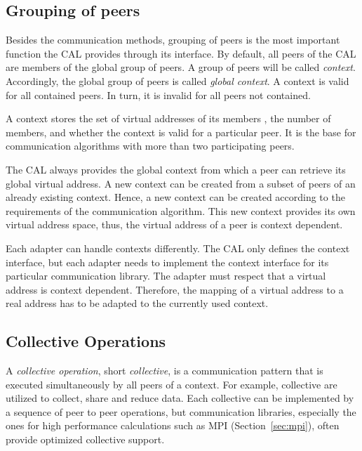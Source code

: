 \subsection{Grouping of peers}
\label{sec:cal_context}
Besides the communication methods, grouping of peers is the most
important function the CAL provides through its interface.  By
default, all peers of the CAL are members of the global group of peers.
A group of peers will be called \textit{context}. Accordingly, the
global group of peers is called \emph{global context}. A context is valid for
all contained peers. In turn, it is invalid for all peers not
contained.

A context stores the set of virtual addresses of its members , the
number of members, and whether the context is valid for a particular
peer. It is the base for communication algorithms with more than two
participating peers.

The CAL always provides the global context from which a peer can
retrieve its global virtual address. A new context can be created from
a subset of peers of an already existing context. Hence, a new context
can be created according to the requirements of the communication
algorithm. This new context provides its own virtual address space,
thus, the virtual address of a peer is context dependent.

Each adapter can handle contexts differently. The CAL only
defines the context interface, but each adapter needs to implement the
context interface for its particular communication
library. The adapter must respect that a virtual address
is context dependent. Therefore, the mapping of a virtual address to a
real address has to be adapted to the currently used context.

\subsection{Collective Operations}
\label{sec:cal_collective}
A \textit{collective operation}, short \textit{collective}, is a
communication pattern that is executed simultaneously by all peers of
a context. For example, collective are utilized to collect,
share and reduce data.  Each collective can be implemented by a
sequence of peer to peer operations, but communication libraries,
especially the ones for high performance calculations such as MPI
(Section~\ref{sec:mpi}), often provide optimized collective support.

